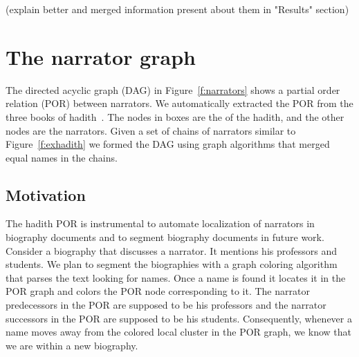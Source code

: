 \documentclass{llncs}
\begin{document}
(explain better and merged information present about them in "Results" section)

\section{The narrator graph}
\label{sec:graph}

\begin{figure}[tb]
\end{figure}

The directed acyclic graph (DAG) 
in Figure~\ref{f:narrators} shows a partial order 
relation (POR) between narrators.
We automatically extracted the POR from the three books of 
hadith~\cite{IbnHanbal,AlKulayni,AlTousi}.
The nodes in boxes are the  of the hadith, 
and the other nodes are the narrators.
Given a set of chains of narrators similar to 
Figure~\ref{f:exhadith} we formed the DAG using graph algorithms 
that merged equal names in the chains. 

\subsection{Motivation}

The hadith POR is instrumental to automate
localization of narrators in biography documents and
to segment biography documents in future work.
Consider a biography that discusses a narrator.
It mentions his professors and students.
We plan to segment the biographies with a graph 
coloring algorithm
that parses the text looking for names. 
Once a name is found it locates it in the POR graph
and colors the POR node corresponding
to it.
The narrator predecessors in the POR are supposed to be
his professors and the narrator successors in the POR 
are supposed to be his students. 
Consequently, whenever a name moves away from the 
colored local cluster in the POR graph, 
we know that we are within a new biography. 
\end{document}
